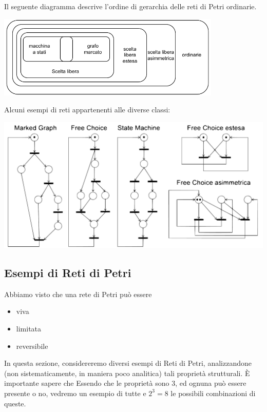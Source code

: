 \documentclass[10pt, letterpaper]{report}
\begin{document}
Il seguente diagramma descrive l'ordine di gerarchia delle reti di Petri ordinarie.
\begin{center}
    \includegraphics[width=0.8\textwidth]{images/GerarchiaPetri.drawio.pdf}
\end{center}
Alcuni esempi di reti appartenenti alle diverse classi:\begin{center}
    \includegraphics[width=\textwidth]{images/PetriEsempi.pdf}
\end{center}
\subsection{Esempi di Reti di Petri}
Abbiamo visto che una rete di Petri può essere\begin{itemize}
    \item viva 
    \item limitata 
    \item reversibile 
\end{itemize}
In questa sezione, considereremo diversi esempi di Reti di Petri, analizzandone (non sistematicamente, in maniera poco analitica) tali proprietà strutturali. È importante sapere che
Essendo che le proprietà sono 3, ed ognuna può essere presente o no, vedremo un esempio di tutte e $2^3=8$ le possibili combinazioni di queste.
\end{document}
